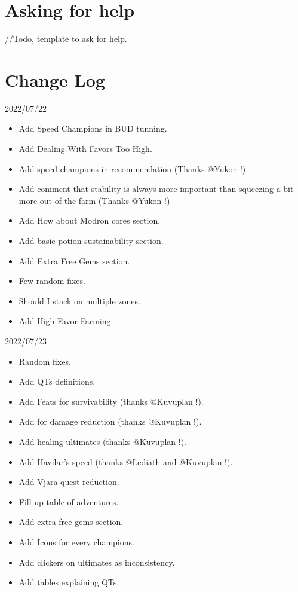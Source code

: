 \documentclass{article}
\begin{document}
\section{Asking for help}
//Todo, template to ask for help.



\section{Change Log}

2022/07/22 
\begin{itemize}
    \item Add Speed Champions in BUD tunning.
    \item Add Dealing With Favors Too High.
    \item Add speed champions in recommendation (Thanks @Yukon !)
    \item Add comment that stability is always more important than squeezing a bit more out of the farm (Thanks @Yukon !)
    \item Add How about Modron cores section.
    \item Add basic potion sustainability section.
    \item Add Extra Free Gems section.
    \item Few random fixes.
    \item Should I stack on multiple zones.
    \item Add High Favor Farming.
\end{itemize}

2022/07/23
\begin{itemize}
    \item Random fixes.
    \item Add QTs definitions.
    \item Add Feats for survivability (thanks @Kuvuplan !).
    \item Add \selise for damage reduction (thanks @Kuvuplan !).
    \item Add healing ultimates (thanks @Kuvuplan !).
    \item Add Havilar's speed (thanks @Lediath and @Kuvuplan !).
    \item Add Vjara quest reduction.
    \item Fill up table of adventures.
    \item Add extra free gems section.
    \item Add Icons for every champions.
    \item Add clickers on ultimates as inconsistency.
    \item Add tables explaining QTs.
\end{itemize}
\end{document}
